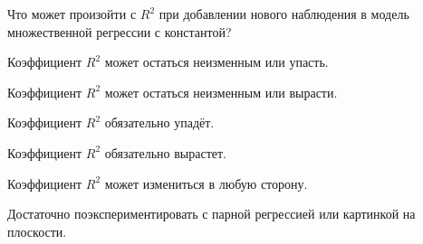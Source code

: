 
\begin{question}
Что может произойти с \(R^2\) при добавлении нового наблюдения в модель множественной регрессии с константой?
\begin{answerlist}
  \item Коэффициент \(R^2\) может остаться неизменным или упасть.
  \item Коэффициент \(R^2\) может остаться неизменным или вырасти.
  \item Коэффициент \(R^2\) обязательно упадёт.
  \item Коэффициент \(R^2\) обязательно вырастет.
  \item Коэффициент \(R^2\) может измениться в любую сторону.
\end{answerlist}
\end{question}

\begin{solution}
Достаточно поэкспериментировать с парной регрессией или картинкой на плоскости.
\end{solution}

